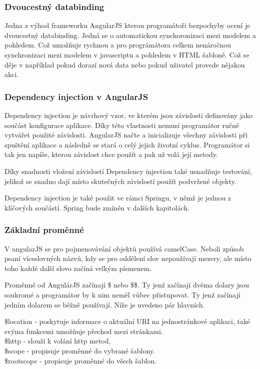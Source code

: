 \documentclass[czech,master,public,dept460,male,cpdeclaration,twoside]{diploma}
\begin{document}
\subsubsection{Dvoucestný databinding}
Jedna z výhod frameworku AngularJS kterou programátoři bezpochyby ocení je dvoucestný databinding. Jedná se o automatickou synchoronizaci mezi modelem a pohledem. Což umožňuje rychnou a pro prográmátora celkem nenáročnou synchronizaci mezi modelem v javascriptu a pohledem v HTML šabloně. Což se děje v například pokud dorazí nová data nebo pokud uživatel provede nějakou akci. \cite{databinding}

\subsubsection{Dependency injection v AngularJS}
Dependency injection je návrhový vzor, ve kterém jsou závislosti definovány jako součást konfigurace aplikace. Díky této vlastnosti nemusí programátor ručně vytvářet použité závislosti. AngularJS načte a inicializuje všechny závislosti při spuštění aplikace a následně se stará o celý jejich životní cyklus. Programátor si tak jen napíše, kterou závislost chce použít a pak už volá její metody.

Díky snadnosti vložení závislostí Dependency injection také usnadňuje testování, jelikož se snadno dají místo skutečných závislostí použít podvržené objekty.

Dependency injection je také použit ve rámci Springu, v němž je jednou z klíčových součástí. Spring bude zmíněn v dalších kapitolách. \cite{LearningAngularjs}

\subsubsection{Základní proměnné}
V angularJS se pro pojmenovávání objektů používá camelCase. Neboli způsob psaní víceslovných názvů, kdy se pro oddělení slov nepoužívají mezery, ale místo toho každé další slovo začíná velkým písmenem.

Proměnné od AngulárJS začínají \$ nebo \$\$. Ty jenž začínají dvěma dolary jsou soukromé a programátor by k nim neměl vůbec přistupovat. Ty jenž začínají jedním dolarem se běžně používají. Níže je uvedeno pár hlavních.

\$location - poskytuje informace o aktuální URI na jednostránkové aplikaci, také svýma funkcemi umožňuje přechod mezi stránkami.\\
\$http - slouží k volání http metod,\\
\$scope - propisuje proměnné do vybrané šablony.\\
\$rootscope - propisuje proměnné do všech šablon.
\end{document}

